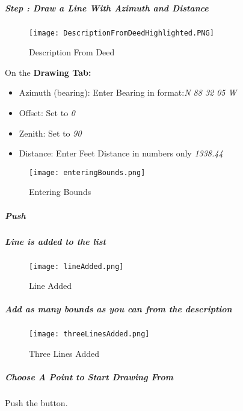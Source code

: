 
\subparagraph*{{\LARGE Step \thestepCount:} Draw a Line With Azimuth and Distance}

\begin{figure}[H]
\centering
    \texttt{[image: DescriptionFromDeedHighlighted.PNG]}
\vspace{-.1in}

\caption{Description From Deed}
\end{figure}
On the \textbf{Drawing Tab:}
\begin{itemize}
\item Azimuth (bearing): Enter Bearing in format:\emph{N 88 32 05 W}
\item Offset: Set to \emph{0}
\item Zenith: Set to \emph{90}
\item Distance: Enter Feet Distance in numbers only \emph{1338.44}
\end{itemize}
\begin{figure}[H]
\centering
    \texttt{[image: enteringBounds.png]}
\vspace{-.1in}

\caption{Entering Bounds}
\end{figure}

\subparagraph*{Push }

\clearpage


\subparagraph*{Line is added to the list}

\begin{figure}[H]
\centering
    \texttt{[image: lineAdded.png]}
\vspace{-.1in}

\caption{Line Added}
\end{figure}


\subparagraph*{Add as many bounds as you can from the description}

\begin{figure}[H]
\centering
    \texttt{[image: threeLinesAdded.png]}
\vspace{-.1in}

\caption{Three Lines Added}
\end{figure}

\clearpage

\subparagraph*{Choose A Point to Start Drawing From\\}
Push the \textbf{} button.\\

